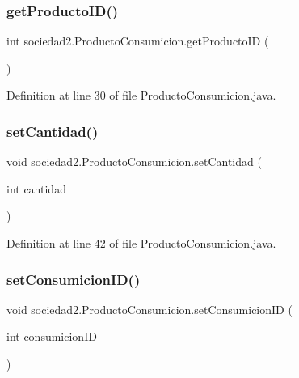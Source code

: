 \subsubsection{\texorpdfstring{get\+Producto\+I\+D()}{getProductoID()}}
{\footnotesize\ttfamily int sociedad2.\+Producto\+Consumicion.\+get\+Producto\+ID (\begin{DoxyParamCaption}{ }\end{DoxyParamCaption})}



Definition at line 30 of file Producto\+Consumicion.\+java.

\mbox{\label{classsociedad2_1_1_producto_consumicion_aabf7ed1d1ea38ab69262c3ae7c47b69d}} 
\subsubsection{\texorpdfstring{set\+Cantidad()}{setCantidad()}}
{\footnotesize\ttfamily void sociedad2.\+Producto\+Consumicion.\+set\+Cantidad (\begin{DoxyParamCaption}\item[{int}]{cantidad }\end{DoxyParamCaption})}



Definition at line 42 of file Producto\+Consumicion.\+java.

\mbox{\label{classsociedad2_1_1_producto_consumicion_a28951a9049e55f281f5a13ddd8b73b78}} 
\subsubsection{\texorpdfstring{set\+Consumicion\+I\+D()}{setConsumicionID()}}
{\footnotesize\ttfamily void sociedad2.\+Producto\+Consumicion.\+set\+Consumicion\+ID (\begin{DoxyParamCaption}\item[{int}]{consumicion\+ID }\end{DoxyParamCaption})}



